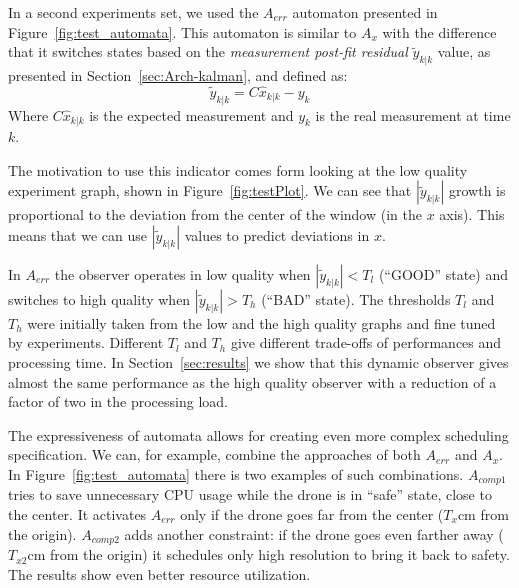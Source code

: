 \documentclass[ twoside, 12pt ]{article}
\begin{document}
In a second experiments set, we used the $A_{err}$ automaton presented in Figure~\ref{fig:test_automata}. This automaton is similar to $A_x$ with the difference that it switches states based on the \textit{measurement post-fit residual} $\tilde{y}_{k|k}$ value, as presented in Section~\ref{sec:Arch-kalman}, and defined as:
$$\tilde{y}_{k|k} =  C\hat{x}_{k|k} - y_k $$
Where $C\hat{x}_{k|k}$ is the expected measurement and $y_k$ is the real measurement at time $k$.

The motivation to use this indicator comes form looking at the low quality experiment graph, shown in Figure~\ref{fig:testPlot}. We can see that $\left| \tilde{y}_{k|k} \right|$ growth is proportional to the deviation from the center of the window (in the $x$ axis). 
This means that we can use $\left| \tilde{y}_{k|k} \right|$ values to predict deviations in $x$.

In $A_{err}$ the observer operates in low quality when $\left| \tilde{y}_{k|k} \right| < T_{l}$ (``GOOD'' state) and switches to high quality when $\left| \tilde{y}_{k|k} \right| > T_{h}$ (``BAD'' state).
The thresholds $T_{l}$ and $T_{h}$ were initially taken from the low and the high quality graphs and fine tuned by experiments. 
Different $T_{l}$ and $T_{h}$ give different trade-offs of performances and processing time.
In Section~\ref{sec:results} we show that this dynamic observer gives almost the same performance as the high quality observer with a reduction of a factor of two in the processing load.

The expressiveness of automata allows for creating even more complex scheduling specification. We can, for example, combine the approaches of both $A_{err}$ and $A_{x}$.
In Figure~\ref{fig:test_automata} there is two examples of such combinations. $A_{comp1}$ tries to save unnecessary CPU usage while the drone is in ``safe'' state, close to the center. It activates $A_{err}$ only if the drone goes far from the center ($T_{x}$cm from the origin).
$A_{comp2}$ adds another constraint: if the drone goes even farther away ($T_{x2}$cm from the origin) it schedules only high resolution to bring it back to safety.
The results show even better resource utilization.
\end{document}
